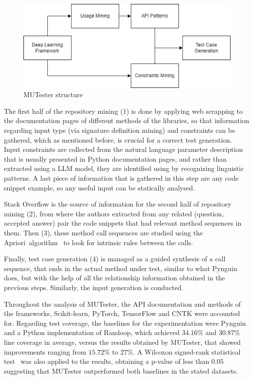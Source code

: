 \documentclass[%
  chapterprefix=false,%
  open=right,%
  twoside=true,%
  paper=a4,%
  logofile={Figures/logo.png},%
  thesistype=master,%
  UKenglish,%
]{se2thesis}
\begin{document}

\begin{figure}[tb]
  \centering 
  \includegraphics[width=.99\textwidth]{Figures/mutester.png}
  \caption{MUTester structure }\label{fig:mutester}
\end{figure}

The first half of the repository mining (1) is done by applying web scrapping to the documentation pages of different methods of the libraries, so that information regarding input type (via signature definition mining) and constraints can be gathered, which as mentioned before, is crucial for a correct test generation.
Input constraints are collected from the natural language parameter description that is usually presented in Python documentation pages, and rather than extracted using a LLM model, they are identified using by recognizing linguistic patterns.
A last piece of information that is gathered in this step are any code snippet example, so any useful input can be statically analysed.

Stack Overflow is the source of information for the second half of repository mining (2), from where the authors extracted from any related (question, accepted answer) pair the code snippets that had relevant method sequences in them.
Then (3), these method call sequences are studied using the Apriori~algorithm~\cite{agrawal1994fast} to look for intrinsic rules between the calls.

Finally, test case generation (4) is managed as a guided synthesis of a call sequence, that ends in the actual method under test, similar to what Pynguin does, but with the help of all the relationship information obtained in the previous steps.
Similarly, the input generation is conducted.

Throughout the analysis of MUTester, the API documentation and methods of the frameworks,  Scikit-learn, PyTorch, TensorFlow and CNTK were accounted for.
Regarding test coverage, the baselines for the experimentation were Pynguin and a Python implementation of Randoop, which achieved \(34.16\%\) and \(30.87\%\) line coverage in average, versus the results obtained by MUTester, that showed improvements ranging from \(15.72\%\) to \(27\%\).
A Wilcoxon signed-rank
statistical test~\cite{Rey2011} was also applied to the results, obtaining a p-value of less than \(0.05\) suggesting that MUTester outperformed both baselines in the stated datasets.
\end{document}
